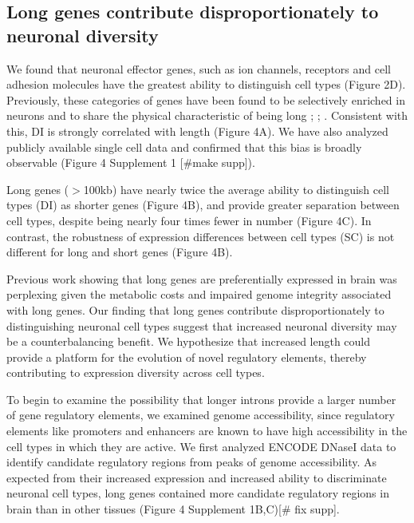 \subsection{Long genes contribute disproportionately to neuronal diversity}

We found that neuronal effector genes, such as ion channels, receptors and cell adhesion molecules have the greatest ability to distinguish cell types (Figure 2D). Previously, these categories of genes have been found to be selectively enriched in neurons and to share the physical characteristic of being long \cite{Sugino_2014}; \cite{Gabel_2015}; \cite{Zylka_2015}. Consistent with this, DI is strongly correlated with length (Figure 4A). We have also analyzed publicly available single cell data and confirmed that this bias is broadly observable (Figure 4 Supplement 1 [#make supp]). 

Long genes ($\gt$100kb) have nearly twice the average ability to distinguish cell types (DI) as shorter genes (Figure 4B), and provide greater separation between cell types, despite being nearly four times fewer in number (Figure 4C). In contrast, the robustness of expression differences between cell types (SC) is not different for long and short genes (Figure 4B).  

Previous work showing that long genes are preferentially expressed in brain was perplexing given the metabolic costs \cite{Castillo_Davis_2002} and impaired genome integrity \cite{Wei_2016} associated with long genes. Our finding that long genes contribute disproportionately to distinguishing neuronal cell types suggest that increased neuronal diversity may be a counterbalancing benefit. We hypothesize that increased length could provide a platform for the evolution of novel regulatory elements, thereby contributing to expression diversity across cell types.

To begin to examine the possibility that longer introns provide a larger number of gene regulatory elements, we examined genome accessibility, since regulatory elements like promoters and enhancers are known to have high accessibility in the cell types in which they are active. We first analyzed ENCODE DNaseI data to identify candidate regulatory regions from peaks of genome accessibility. As expected from their increased expression and increased ability to discriminate neuronal cell types, long genes contained more candidate regulatory regions in brain than in other tissues (Figure 4 Supplement 1B,C)[# fix supp]. 

